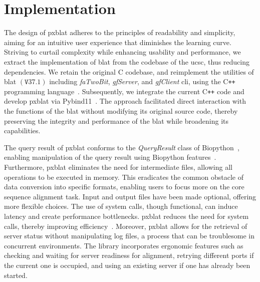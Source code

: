 \section*{Implementation}\label{sec:implementation}

The design of \gls{pxblat} adheres to the principles of readability and simplicity, aiming for an intuitive user experience that diminishes the learning curve.
Striving to curtail complexity while enhancing usability and performance, we extract the implementation of \gls{blat} from the codebase of the \gls{ucsc}, thus reducing dependencies.
We retain the original C codebase, and reimplement the utilities of \gls{blat} \(\left(\mathtt{V}37.1\right)\) including \emph{faTwoBit}, \emph{gfServer}, and \emph{gfClient} \gls{cli}, using the C\texttt{++} programming language~\citep{kent2002blat}.
Subsequently, we integrate the current C\texttt{++} code and develop \gls{pxblat} via Pybind11~\citep{pybind11}.
The approach facilitated direct interaction with the functions of the \gls{blat} without modifying its original source code, thereby preserving the integrity and performance of the \gls{blat} while broadening its capabilities.

The query result of \gls{pxblat} conforms to the \emph{QueryResult} class of Biopython~\citep{cock2009biopython}, enabling  manipulation of the query result using Biopython features~.
Furthermore, \gls{pxblat} eliminates the need for intermediate files, allowing all operations to be executed in memory.
This eradicates the common obstacle of data conversion into specific formats, enabling users to focus more on the core sequence alignment task.
Input and output files have been made optional, offering more flexible choices.
The use of system calls, though functional, can induce latency and create performance bottlenecks.
\gls{pxblat} reduces the need for system calls, thereby improving efficiency~.
Moreover, \gls{pxblat} allows for the retrieval of server status without manipulating log files, a process that can be troublesome in concurrent environments.
The library incorporates ergonomic features such as checking and waiting for server readiness for alignment, retrying different ports if the current one is occupied, and using an existing server if one has already been started.

